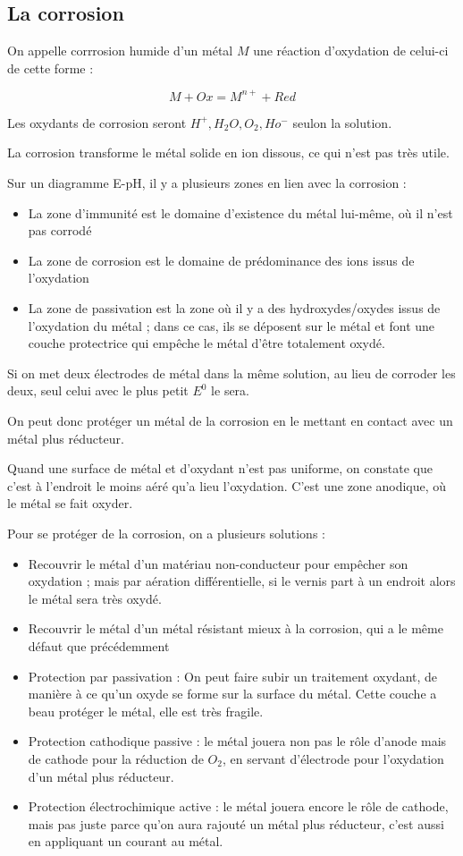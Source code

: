 \documentclass[a4paper,12pt]{book}
\newcommand{\Def}[2]{\begin{tcolorbox}[colback=white,colframe=red!10!green!20!blue!75!, title=Définition : #1]#2\end{tcolorbox}}
\newcommand{\Thr}[2]{\begin{tcolorbox}[sharp corners, colback=white,colframe=red!10!blue!30!green!75!, title=Théorème : #1]#2\end{tcolorbox}}
\begin{document}
\subsection{La corrosion}
\Def{Corrosion}{On appelle corrrosion humide d'un métal $M$ une réaction d'oxydation de celui-ci de cette forme :
\par $$M+Ox =M^{n+}+Red$$
\par Les oxydants de corrosion seront $H^+, H_2O, O_2, Ho^-$ seulon la solution.
\par La corrosion transforme le métal solide en ion dissous, ce qui n'est pas très utile.}
\Def{Les domaines}{Sur un diagramme E-pH, il y a plusieurs zones en lien avec la corrosion :\begin{itemize}
\item La zone d'immunité est le domaine d'existence du métal lui-même, où il n'est pas corrodé
\item La zone de corrosion est le domaine de prédominance des ions issus de l'oxydation
\item La zone de passivation est la zone où il y a des hydroxydes/oxydes issus de l'oxydation du métal ; dans ce cas, ils se déposent sur le métal et font une couche protectrice qui empêche le métal d'être totalement oxydé.
\end{itemize}}
\Def{Pile de corrosion}{Si on met deux électrodes de métal dans la même solution, au lieu de corroder les deux, seul celui avec le plus petit $E^0$ le sera.
\par On peut donc protéger un métal de la corrosion en le mettant en contact avec un métal plus réducteur.}
\Thr{Aération différentielle}{Quand une surface de métal et d'oxydant n'est pas uniforme, on constate que c'est à l'endroit le moins aéré qu'a lieu l'oxydation. C'est une zone anodique, où le métal se fait oxyder.}
\Def{Types de protection}{Pour se protéger de la corrosion, on a plusieurs solutions :\begin{itemize}
\item Recouvrir le métal d'un matériau non-conducteur pour empêcher son oxydation ; mais par aération différentielle, si le vernis part à un endroit alors le métal sera très oxydé.
\item Recouvrir le métal d'un métal résistant mieux à la corrosion, qui a le même défaut que précédemment
\item Protection par passivation : On peut faire subir un traitement oxydant, de manière à ce qu'un oxyde se forme sur la surface du métal. Cette couche a beau protéger le métal, elle est très fragile.
\item Protection cathodique passive : le métal jouera non pas le rôle d'anode mais de cathode pour la réduction de $O_2$, en servant d'électrode pour l'oxydation d'un métal plus réducteur.
\item Protection électrochimique active : le métal jouera encore le rôle de cathode, mais pas juste parce qu'on aura rajouté un métal plus réducteur, c'est aussi en appliquant un courant au métal. 
\end{itemize}}
\end{document}
